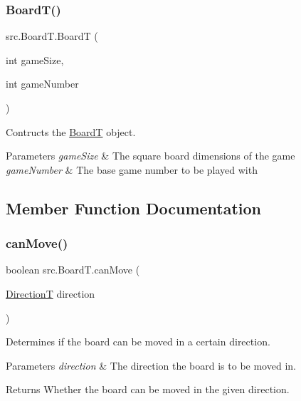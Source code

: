 \subsubsection{\texorpdfstring{Board\+T()}{BoardT()}}
{\footnotesize\ttfamily src.\+Board\+T.\+BoardT (\begin{DoxyParamCaption}\item[{int}]{game\+Size,  }\item[{int}]{game\+Number }\end{DoxyParamCaption})}



Contructs the \hyperlink{classsrc_1_1BoardT}{BoardT} object. 


\begin{DoxyParams}{Parameters}
{\em game\+Size} & The square board dimensions of the game \\
\hline
{\em game\+Number} & The base game number to be played with \\
\hline
\end{DoxyParams}


\subsection{Member Function Documentation}
\mbox{\label{classsrc_1_1BoardT_ac40c97bc9e022882e5120fb0195e80e2}} 
\subsubsection{\texorpdfstring{can\+Move()}{canMove()}}
{\footnotesize\ttfamily boolean src.\+Board\+T.\+can\+Move (\begin{DoxyParamCaption}\item[{\hyperlink{enumsrc_1_1DirectionT}{DirectionT}}]{direction }\end{DoxyParamCaption})}



Determines if the board can be moved in a certain direction. 


\begin{DoxyParams}{Parameters}
{\em direction} & The direction the board is to be moved in. \\
\hline
\end{DoxyParams}
\begin{DoxyReturn}{Returns}
Whether the board can be moved in the given direction. 
\end{DoxyReturn}
\mbox{\label{classsrc_1_1BoardT_a5ba0ca6da4a092e6f693379b09e4354c}} 
